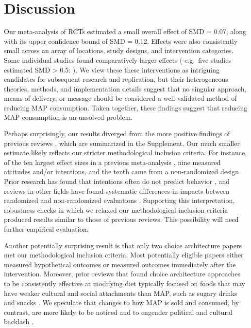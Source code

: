 \documentclass[sn-nature,referee,pdflatex]{sn-jnl}
\begin{document}
\section{Discussion}\label{discussion}

Our meta-analysis of RCTs estimated a small overall effect of SMD =
0.07, along with its upper confidence bound of SMD = 0.12. Effects were
also consistently small across an array of locations, study designs, and
intervention categories. Some individual studies found comparatively
larger effects ( e.g.~five studies estimated SMD \textgreater{} 0.5:
\citep{carfora2023, merrill2009, kanchanachitra2020, bianchi2022, piester2020}).
We view these these interventions as intriguing candidates for
subsequent research and replication, but their heterogeneous theories,
methods, and implementation details suggest that no singular approach,
means of delivery, or message should be considered a well-validated
method of reducing MAP consumption. Taken together, these findings
suggest that reducing MAP consumption is an unsolved problem.

Perhaps surprisingly, our results diverged from the more positive
findings of previous reviews
\citep{mathur2021meta, meier2022, mertens2022}, which are summarized in
the Supplement. Our much smaller estimate likely reflects our stricter
methodological inclusion criteria. For instance, of the ten largest
effect sizes in a previous meta-analysis
\citep{mathur2021effectiveness}, nine measured attitudes and/or
intentions, and the tenth came from a non-randomized design. Prior
research has found that intentions often do not predict behavior
\citep{mathur2021effectiveness}, and reviews in other fields have found
systematic differences in impacts between randomized and non-randomized
evaluations \citep{porat2024, stevenson2023}. Supporting this
interpretation, robustness checks in which we relaxed our methodological
inclusion criteria produced results similar to those of previous
reviews. This possibility will need further empirical evaluation.

Another potentially surprising result is that only two choice
architecture papers met our methodological inclusion criteria. Most
potentially eligible papers either measured hypothetical outcomes or
measured outcomes immediately after the intervention. Moreover, prior
reviews that found choice architecture approaches to be consistently
effective at modifying diet typically focused on foods that may have
weaker cultural and social attachments than MAP, such as sugary drinks
and snacks \citep{venema2020, adriaanse2009}. We speculate that changes
to how MAP is sold and consumed, by contrast, are more likely to be
noticed and to engender political and cultural backlash
\citep{popper2019}.
\end{document}
